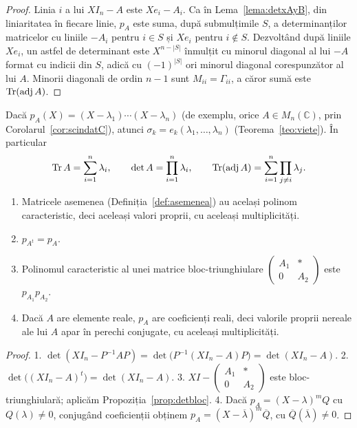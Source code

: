 \begin{proof}
Linia $i$ a lui $XI_n-A$ este $Xe_i-A_i$. Ca în Lema~\ref{lema:detxAyB}, din liniaritatea în fiecare linie, $p_A$ este suma, după submulțimile $S$, a determinanților matricelor cu liniile $-A_i$ pentru $i\in S$ și $Xe_i$ pentru $i\notin S$. Dezvoltând după liniile $Xe_i$, un astfel de determinant este $X^{n-|S|}$ înmulțit cu minorul diagonal al lui $-A$ format cu indicii din $S$, adică cu $(-1)^{|S|}$ ori minorul diagonal corespunzător al lui $A$. Minorii diagonali de ordin $n-1$ sunt $M_{ii}=\Gamma_{ii}$, a căror sumă este $\operatorname{Tr}(\operatorname{adj} A)$.
\end{proof}

\begin{teorema}\label{teo:vietevalprop}
Dacă $p_A(X)=(X-\lambda_1)\cdots(X-\lambda_n)$ (de exemplu, orice $A\in M_n(\mathbb{C})$, prin Corolarul~\ref{cor:scindatC}), atunci $\sigma_k=e_k(\lambda_1,\dots,\lambda_n)$ (Teorema~\ref{teo:viete}). În particular
\[
\operatorname{Tr} A=\sum_{i=1}^n\lambda_i,\qquad\det A=\prod_{i=1}^n\lambda_i,\qquad\operatorname{Tr}(\operatorname{adj} A)=\sum_{i=1}^n\prod_{j\neq i}\lambda_j .
\]
\end{teorema}

\begin{propozitie}\label{prop:polcarinvariant}
\begin{enumerate}
\item Matricele asemenea (Definiția~\ref{def:asemenea}) au același polinom caracteristic, deci aceleași valori proprii, cu aceleași multiplicități.
\item $p_{A^t}=p_A$.
\item Polinomul caracteristic al unei matrice bloc-triunghiulare $\begin{pmatrix}A_1&*\\0&A_2\end{pmatrix}$ este $p_{A_1}p_{A_2}$.
\item Dacă $A$ are elemente reale, $p_A$ are coeficienți reali, deci valorile proprii nereale ale lui $A$ apar în perechi conjugate, cu aceleași multiplicități.
\end{enumerate}
\end{propozitie}

\begin{proof}
1. $\det(XI_n-P^{-1}AP)=\det\bigl(P^{-1}(XI_n-A)P\bigr)=\det(XI_n-A)$.
2. $\det\bigl((XI_n-A)^t\bigr)=\det(XI_n-A)$.
3. $XI-\begin{pmatrix}A_1&*\\0&A_2\end{pmatrix}$ este bloc-triunghiulară; aplicăm Propoziția~\ref{prop:detbloc}.
4. Dacă $p_A=(X-\lambda)^mQ$ cu $Q(\lambda)\neq0$, conjugând coeficienții obținem $p_A=(X-\overline\lambda)^m\overline Q$, cu $\overline Q(\overline\lambda)\neq0$.
\end{proof}


